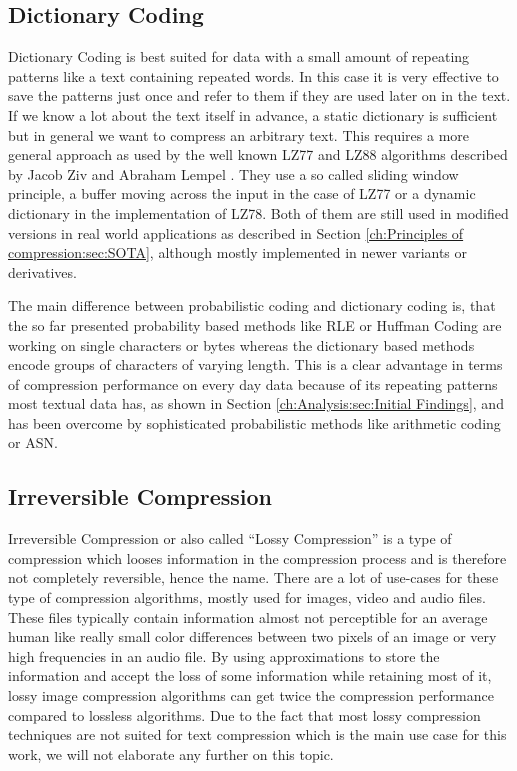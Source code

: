\subsection{Dictionary Coding}
\par{
Dictionary Coding is best suited for data with a small amount of repeating patterns like a text containing repeated words. In this case it is very effective to save the patterns just once and refer to them if they are used later on in the text. If we know a lot about the text itself in advance, a static dictionary is sufficient but in general we want to compress an arbitrary text. This requires a more general approach as used by the well known LZ77 and LZ88 algorithms described by Jacob Ziv and Abraham Lempel \cite{lz}. They use a so called sliding window principle, a buffer moving across the input in the case of LZ77 or a dynamic dictionary in the implementation of LZ78. Both of them are still used in modified versions in real world applications as described in Section \ref{ch:Principles of compression:sec:SOTA}, although mostly implemented in newer variants or derivatives.
}
\par{
The main difference between probabilistic coding and dictionary coding is, that the so far presented probability based methods like RLE or Huffman Coding are working on single characters or bytes whereas the dictionary based methods encode groups of characters of varying length. This is a clear advantage in terms of compression performance on every day data because of its repeating patterns most textual data has, as shown in Section \ref{ch:Analysis:sec:Initial Findings}, and has been overcome by sophisticated probabilistic methods like arithmetic coding or ASN.
}


\subsection{Irreversible Compression}
\par{
Irreversible Compression or also called \enquote{Lossy Compression} is a type of compression which looses information in the compression process and is therefore not completely reversible, hence the name. There are a lot of use-cases for these type of compression algorithms, mostly used for images, video and audio files. These files typically contain information almost not perceptible for an average human like really small color differences between two pixels of an image or very high frequencies in an audio file. By using approximations to store the information and accept the loss of some information while retaining most of it, lossy image compression algorithms can get twice the compression performance compared to lossless algorithms. Due to the fact that most lossy compression techniques are not suited for text compression which is the main use case for this work, we will not elaborate any further on this topic.
}


